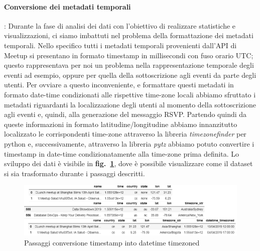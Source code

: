 \documentclass[fleqn,10pt]{SelfArx} %
\begin{document}
{{\paragraph{Conversione dei metadati temporali}: Durante la fase di analisi dei dati con l'obiettivo di realizzare statistiche e visualizzazioni, ci siamo imbattuti nel problema della formattazione dei metadati temporali. Nello specifico tutti i metadati temporali provenienti dall'API di Meetup si presentano in formato timestamp in millisecondi con fuso orario UTC; questo rappresentava per noi un problema nella rappresentazione temporale degli eventi ad esempio, oppure per quella della sottoscrizione agli eventi da parte degli utenti. Per ovviare a questo inconveniente, e formattare questi metadati in formato date-time condizionati alle rispettive time-zone locali abbiamo sfruttato i metadati riguardanti la localizzazione degli utenti al momento della sottoscrizione agli eventi e, quindi, alla generazione del messaggio RSVP. Partendo quindi da queste informazioni in formato latitudine/longitudine abbiamo innanzitutto localizzato le corrispondenti time-zone attraverso la libreria \textit{timezonefinder} per python e, successivamente, attraverso la libreria \textit{pytz} abbiamo potuto convertire i timestamp in date-time condizionatamente alla time-zone prima definita. Lo sviluppo dei dati è visibile in \textbf{fig.~\ref{datetime_timezoned}}, dove è possibile visualizzare come il dataset si sia trasformato durante i passaggi descritti.
\begin{figure}
\centering
\includegraphics[width = 9 cm, height = 3.5 cm]{datetime_timezoned.PNG}
\caption{\label{datetime_timezoned} Passaggi conversione timestamp into datetime timezoned}
\end{figure}
}}
\end{document}
